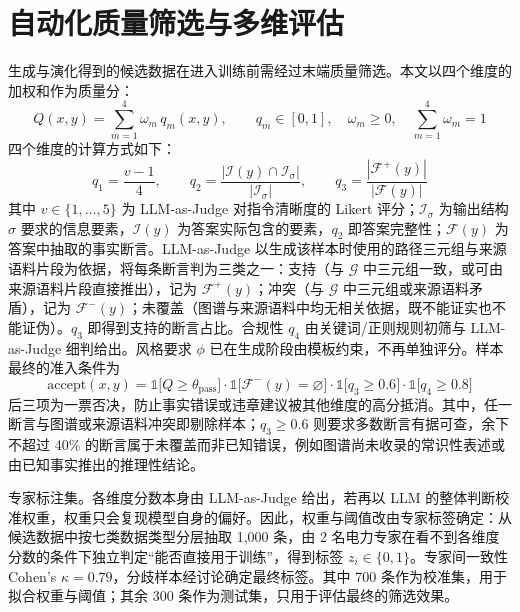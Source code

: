 \documentclass[fontset=fandol,type=master,campus=shenzhen,etitleauto=true]{hithesisbook}
\begin{document}
\section{自动化质量筛选与多维评估}\label{ux81eaux52a8ux5316ux8d28ux91cfux7b5bux9009ux4e0eux591aux7ef4ux8bc4ux4f30}

生成与演化得到的候选数据在进入训练前需经过末端质量筛选。本文以四个维度的加权和作为质量分：
\begin{equation}\label{eq:quality}
Q(x, y) = \sum_{m=1}^{4} \omega_m\, q_m(x, y), \qquad q_m \in [0, 1], \quad \omega_m \ge 0, \quad \sum_{m=1}^{4} \omega_m = 1
\end{equation}
四个维度的计算方式如下：
\begin{equation}\label{eq:quality-dims}
q_1 = \frac{v - 1}{4}, \qquad
q_2 = \frac{|\mathcal{I}(y) \cap \mathcal{I}_\sigma|}{|\mathcal{I}_\sigma|}, \qquad
q_3 = \frac{|\mathcal{F}^{+}(y)|}{|\mathcal{F}(y)|}
\end{equation}
其中 $v \in \{1, \ldots, 5\}$ 为 LLM-as-Judge 对指令清晰度的 Likert 评分；$\mathcal{I}_\sigma$ 为输出结构 $\sigma$ 要求的信息要素，$\mathcal{I}(y)$ 为答案实际包含的要素，$q_2$ 即答案完整性；$\mathcal{F}(y)$ 为答案中抽取的事实断言。LLM-as-Judge 以生成该样本时使用的路径三元组与来源语料片段为依据，将每条断言判为三类之一：支持（与 $\mathcal{G}$ 中三元组一致，或可由来源语料片段直接推出），记为 $\mathcal{F}^{+}(y)$；冲突（与 $\mathcal{G}$ 中三元组或来源语料矛盾），记为 $\mathcal{F}^{-}(y)$；未覆盖（图谱与来源语料中均无相关依据，既不能证实也不能证伪）。$q_3$ 即得到支持的断言占比。合规性 $q_4$ 由关键词/正则规则初筛与 LLM-as-Judge 细判给出。风格要求 $\phi$ 已在生成阶段由模板约束，不再单独评分。样本最终的准入条件为
\begin{equation}\label{eq:accept}
\text{accept}(x, y) = \mathbb{1}\bigl[Q \ge \theta_{\text{pass}}\bigr] \cdot \mathbb{1}\bigl[\mathcal{F}^{-}(y) = \varnothing\bigr] \cdot \mathbb{1}\bigl[q_3 \ge 0.6\bigr] \cdot \mathbb{1}\bigl[q_4 \ge 0.8\bigr]
\end{equation}
后三项为一票否决，防止事实错误或违章建议被其他维度的高分抵消。其中，任一断言与图谱或来源语料冲突即剔除样本；$q_3 \ge 0.6$ 则要求多数断言有据可查，余下不超过 40\% 的断言属于未覆盖而非已知错误，例如图谱尚未收录的常识性表述或由已知事实推出的推理性结论。

专家标注集。各维度分数本身由 LLM-as-Judge 给出，若再以 LLM 的整体判断校准权重，权重只会复现模型自身的偏好。因此，权重与阈值改由专家标签确定：从候选数据中按七类数据类型分层抽取 1,000 条，由 2 名电力专家在看不到各维度分数的条件下独立判定“能否直接用于训练”，得到标签 $z_i \in \{0, 1\}$。专家间一致性 Cohen's $\kappa = 0.79$，分歧样本经讨论确定最终标签。其中 700 条作为校准集，用于拟合权重与阈值；其余 300 条作为测试集，只用于评估最终的筛选效果。
\end{document}
